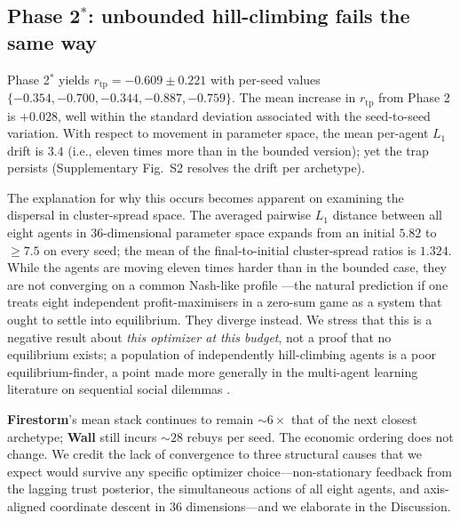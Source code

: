 \documentclass[journal]{IEEEtran}
\newcommand{\arch}[1]{\textbf{#1}}
\newcommand{\rtp}{\ensuremath{r_{\mathrm{tp}}}}
\begin{document}

\subsection{Phase 2$^{*}$: unbounded hill-climbing fails the same way}

Phase 2$^{*}$ yields $\rtp = -0.609 \pm 0.221$ with per-seed
values $\{-0.354, -0.700, -0.344, -0.887, -0.759\}$. The mean
increase in $\rtp$ from Phase 2 is $+0.028$, well within the
standard deviation associated with the seed-to-seed variation.
With respect to movement in parameter space, the mean per-agent
$L_1$ drift is $3.4$ (i.e., eleven times more than in the bounded
version); yet the trap persists (Supplementary Fig.~S2 resolves the drift
per archetype).

The explanation for why this occurs becomes apparent on examining
the dispersal in cluster-spread space. The averaged pairwise $L_1$
distance between all eight agents in 36-dimensional parameter space
expands from an initial $5.82$ to $\ge 7.5$ on every seed; the mean
of the final-to-initial cluster-spread ratios is $1.324$. While the
agents are moving eleven times harder than in the bounded case, they
are not converging on a common Nash-like profile
\citep{nash1950equilibrium}---the natural prediction if one treats
eight independent profit-maximisers in a zero-sum game
\citep{vonneumann1944theory} as a system that ought to settle into
equilibrium. They diverge instead. We stress that this is a negative
result about \emph{this optimizer at this budget}, not a proof that
no equilibrium exists; a population of independently hill-climbing
agents is a poor equilibrium-finder, a point made more generally in
the multi-agent learning literature on sequential social dilemmas
\citep{leibo2017multiagent}.

\arch{Firestorm}'s mean stack continues to remain ${\sim}6{\times}$
that of the next closest archetype; \arch{Wall} still incurs
${\sim}28$ rebuys per seed. The economic ordering does not change.
We credit the lack of convergence to three structural causes that
we expect would survive any specific optimizer choice---non-stationary
feedback from the lagging trust posterior, the simultaneous actions
of all eight agents, and axis-aligned coordinate descent in 36
dimensions---and we elaborate in the Discussion.

\end{document}
